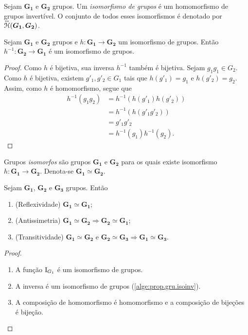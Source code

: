\begin{definition}
Sejam $\bm{G_1}$ e $\bm{G_2}$ grupos. Um \emph{isomorfismo de grupos} é um homomorfismo de grupos invertível. O conjunto de todos esses isomorfismos é denotado por $\accentset{\leftrightarrow}{\mathcal{H}}(\bm{G_1},\bm{G_2})$.
\end{definition}

\begin{proposition}
\label{alge:prop.gru.isoinv}
Sejam $\bm{G_1}$ e $\bm{G_2}$ grupos e $h: \bm{G_1} \to \bm{G_2}$ um isomorfismo de grupos. Então $h^{-1}: \bm{G_2} \to \bm{G_1}$ é um isomorfismo de grupos.
\end{proposition}
\begin{proof}
Como $h$ é bijetiva, sua inversa $h^{-1}$ também é bijetiva. Sejam $g_1g_1 \in G_2$. Como $h$ é bijetiva, existem $g'_1,g'_2 \in G_1$ tais que $h(g'_1)=g_1$ e $h(g'_2)=g_2$. Assim, como $h$ é homomorfismo, segue que
	\begin{align*}
	h^{-1}(g_1g_2) &= h^{-1}(h(g'_1)h(g'_2)) \\
					&= h^{-1}(h(g'_1g'_2)) \\
					&= g'_1g'_2 \\
					&= h^{-1}(g_1)h ^{-1}(g_2).
	\end{align*}
\end{proof}

\begin{definition}
Grupos \emph{isomorfos} são grupos $\bm{G_1}$ e $\bm{G_2}$ para os quais existe isomorfismo $h: \bm{G_1} \to \bm{G_2}$. Denota-se $\bm{G_1} \simeq \bm{G_2}$.
\end{definition}

\begin{proposition}
Sejam $\bm{G_1}$, $\bm{G_2}$ e $\bm{G_3}$ grupos. Então
	\begin{enumerate}
	\item (Reflexividade) $\bm{G_1} \simeq \bm{G_1}$;
	\item (Antissimetria) $\bm{G_1} \simeq \bm{G_2} \Rightarrow \bm{G_2} \simeq \bm{G_1}$;
	\item (Transitividade) $\bm{G_1} \simeq \bm{G_2} \text{\ \ e\ \ } \bm{G_2} \simeq \bm{G_3} \Rightarrow \bm{G_1} \simeq \bm{G_3}$.
	\end{enumerate}
\end{proposition}
\begin{proof}
	\begin{enumerate}
	\item A função $\mathrm{I}_{G_1}$ é um isomorfismo de grupos.
	\item A inversa é um isomorfismo de grupos (\ref{alge:prop.gru.isoinv}).
	\item A composição de homomorfismo é homomorfismo e a composição de bijeções é bijeção.
	\end{enumerate}
\end{proof}

